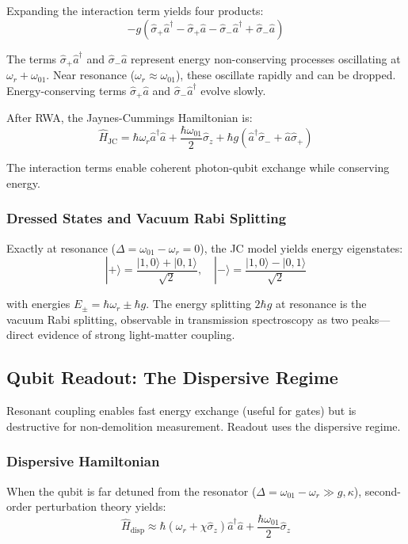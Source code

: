 \documentclass{article}
\begin{document}
Expanding the interaction term yields four products:
$$-g(\hat{\sigma}_+ \hat{a}^\dagger - \hat{\sigma}_+ \hat{a} - \hat{\sigma}_- \hat{a}^\dagger + \hat{\sigma}_- \hat{a})$$

The terms $\hat{\sigma}_+ \hat{a}^\dagger$ and $\hat{\sigma}_- \hat{a}$ represent energy non-conserving processes oscillating at $\omega_r + \omega_{01}$. Near resonance ($\omega_r \approx \omega_{01}$), these oscillate rapidly and can be dropped. Energy-conserving terms $\hat{\sigma}_+ \hat{a}$ and $\hat{\sigma}_- \hat{a}^\dagger$ evolve slowly.

After RWA, the Jaynes-Cummings Hamiltonian is:
$$\hat{H}_{\text{JC}} = \hbar\omega_r \hat{a}^\dagger \hat{a} + \frac{\hbar\omega_{01}}{2}\hat{\sigma}_z + \hbar g(\hat{a}^\dagger \hat{\sigma}_- + \hat{a}\hat{\sigma}_+)$$

The interaction terms enable coherent photon-qubit exchange while conserving energy.

\subsubsection*{Dressed States and Vacuum Rabi Splitting}

Exactly at resonance ($\Delta = \omega_{01} - \omega_r = 0$), the JC model yields energy eigenstates:
$$|+\rangle = \frac{|1,0\rangle + |0,1\rangle}{\sqrt{2}}, \quad |-\rangle = \frac{|1,0\rangle - |0,1\rangle}{\sqrt{2}}$$

with energies $E_\pm = \hbar\omega_r \pm \hbar g$. The energy splitting $2\hbar g$ at resonance is the vacuum Rabi splitting, observable in transmission spectroscopy as two peaks—direct evidence of strong light-matter coupling.

\subsection{Qubit Readout: The Dispersive Regime}

Resonant coupling enables fast energy exchange (useful for gates) but is destructive for non-demolition measurement. Readout uses the dispersive regime.

\subsubsection*{Dispersive Hamiltonian}

When the qubit is far detuned from the resonator ($\Delta = \omega_{01} - \omega_r \gg g, \kappa$), second-order perturbation theory yields:
$$\hat{H}_{\text{disp}} \approx \hbar(\omega_r + \chi\hat{\sigma}_z)\hat{a}^\dagger \hat{a} + \frac{\hbar\omega_{01}}{2}\hat{\sigma}_z$$
\end{document}
